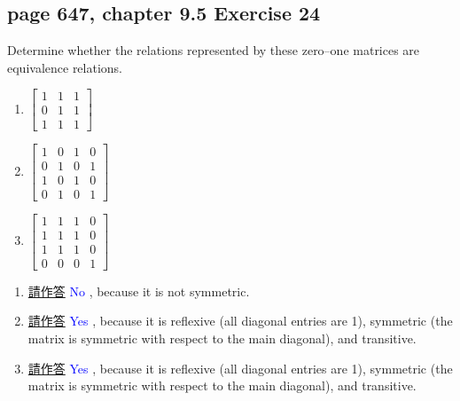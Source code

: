 \documentclass[sigconf]{acmart}
\newcommand{\answer}[2]{%
  \if\relax\detokenize{#2}\relax
    \underline{\mbox{請作答}}%
  \else
    \textcolor{blue}{#2}%
  \fi
}
\begin{document}
\subsection{page 647, chapter 9.5 Exercise 24}
\begin{shaded}
    Determine whether the relations represented by these zero–one matrices are equivalence relations.
    \begin{enumerate}[label=(\alph*)]
        \item 
        $
        \begin{bmatrix}
           1 & 1 & 1 \\
           0 & 1 & 1 \\
           1 & 1 & 1
        \end{bmatrix}
        $
        \item 
        $
        \begin{bmatrix}
           1 & 0 & 1 & 0 \\
           0 & 1 & 0 & 1 \\
           1 & 0 & 1 & 0 \\
           0 & 1 & 0 & 1
        \end{bmatrix}
        $
        \item 
        $
        \begin{bmatrix}
           1 & 1 & 1 & 0 \\
           1 & 1 & 1 & 0 \\
           1 & 1 & 1 & 0 \\
           0 & 0 & 0 & 1
        \end{bmatrix}
        $
    \end{enumerate}
\end{shaded}
\begin{enumerate}[label=(\alph*)]
    \item \answer{9.5.24a}{No}, because it is not symmetric.
    \item \answer{9.5.24b}{Yes}, because it is reflexive (all diagonal entries are 1), symmetric (the matrix is symmetric with respect to the main diagonal), and transitive.
    \item \answer{9.5.24c}{Yes}, because it is reflexive (all diagonal entries are 1), symmetric (the matrix is symmetric with respect to the main diagonal), and transitive.
\end{enumerate}
\end{document}
